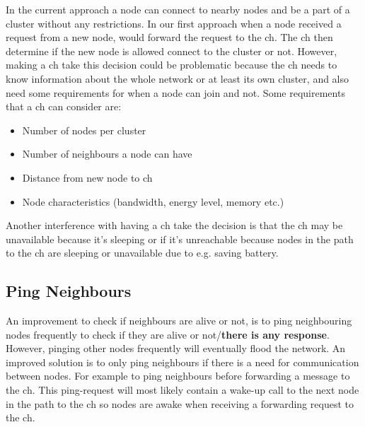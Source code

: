 \documentclass[USenglish]{uit-thesis}
\begin{document}

In the current approach a node can connect to nearby nodes and be a part of a cluster without any restrictions. In our first approach when a node received a request from a new node, would forward the request to the \gls{ch}. The \gls{ch} then determine if the new node is allowed connect to the cluster or not. However, making a \gls{ch} take this decision could be problematic because the \gls{ch} needs to know information about the whole network or at least its own cluster, and also need some requirements for when a node can join and not. Some requirements that a \gls{ch} can consider are:

\begin{itemize}
\item Number of nodes per cluster
\item Number of neighbours a node can have
\item Distance from new node to \gls{ch}
\item Node characteristics (bandwidth, energy level, memory etc.)
\end{itemize}

Another interference with having a \gls{ch} take the decision is that the \gls{ch} may be unavailable because it's sleeping or if it's unreachable because nodes in the path to the \gls{ch} are sleeping or unavailable due to e.g. saving battery. 

\subsection{Ping Neighbours}
An improvement to check if neighbours are alive or not, is to ping neighbouring nodes frequently to check if they are alive or not/\textbf{there is any response}. However, pinging other nodes frequently will eventually flood the network. An improved solution is to only ping neighbours if there is a need for communication between nodes. For example to ping neighbours before forwarding a message to the \gls{ch}. This ping-request will most likely contain a wake-up call to the next node in the path to the \gls{ch} so nodes are awake when receiving a forwarding request to the \gls{ch}.

\end{document}
